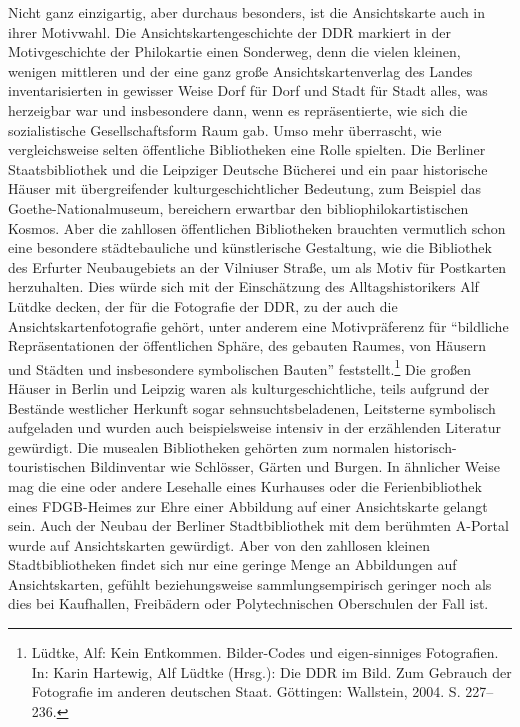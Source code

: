 \documentclass[a4paper,
fontsize=11pt,
oneside,
numbers=noperiodatend,
parskip=half-,
bibliography=totoc,
final
]{scrartcl}
\begin{document}
Nicht ganz einzigartig, aber durchaus besonders, ist die Ansichtskarte
auch in ihrer Motivwahl. Die Ansichtskartengeschichte der DDR markiert
in der Motivgeschichte der Philokartie einen Sonderweg, denn die vielen
kleinen, wenigen mittleren und der eine ganz große Ansichtskartenverlag
des Landes inventarisierten in gewisser Weise Dorf für Dorf und Stadt
für Stadt alles, was herzeigbar war und insbesondere dann, wenn es
repräsentierte, wie sich die sozialistische Gesellschaftsform Raum gab.
Umso mehr überrascht, wie vergleichsweise selten öffentliche
Bibliotheken eine Rolle spielten. Die Berliner Staatsbibliothek und die
Leipziger Deutsche Bücherei und ein paar historische Häuser mit
übergreifender kulturgeschichtlicher Bedeutung, zum Beispiel das
Goethe-Nationalmuseum, bereichern erwartbar den bibliophilokartistischen
Kosmos. Aber die zahllosen öffentlichen Bibliotheken brauchten
vermutlich schon eine besondere städtebauliche und künstlerische
Gestaltung, wie die Bibliothek des Erfurter Neubaugebiets an der
Vilniuser Straße, um als Motiv für Postkarten herzuhalten. Dies würde
sich mit der Einschätzung des Alltagshistorikers Alf Lütdke decken, der
für die Fotografie der DDR, zu der auch die Ansichtskartenfotografie
gehört, unter anderem eine Motivpräferenz für \enquote{bildliche
Repräsentationen der öffentlichen Sphäre, des gebauten Raumes, von
Häusern und Städten und insbesondere symbolischen Bauten}
feststellt.\footnote{Lüdtke, Alf: Kein Entkommen. Bilder-Codes und
  eigen-sinniges Fotografien. In: Karin Hartewig, Alf Lüdtke (Hrsg.):
  Die DDR im Bild. Zum Gebrauch der Fotografie im anderen deutschen
  Staat. Göttingen: Wallstein, 2004. S. 227--236.} Die großen Häuser in
Berlin und Leipzig waren als kulturgeschichtliche, teils aufgrund der
Bestände westlicher Herkunft sogar sehnsuchtsbeladenen, Leitsterne
symbolisch aufgeladen und wurden auch beispielsweise intensiv in der
erzählenden Literatur gewürdigt. Die musealen Bibliotheken gehörten zum
normalen historisch-touristischen Bildinventar wie Schlösser, Gärten und
Burgen. In ähnlicher Weise mag die eine oder andere Lesehalle eines
Kurhauses oder die Ferienbibliothek eines FDGB-Heimes zur Ehre einer
Abbildung auf einer Ansichtskarte gelangt sein. Auch der Neubau der
Berliner Stadtbibliothek mit dem berühmten A-Portal wurde auf
Ansichtskarten gewürdigt. Aber von den zahllosen kleinen
Stadtbibliotheken findet sich nur eine geringe Menge an Abbildungen auf
Ansichtskarten, gefühlt beziehungsweise sammlungsempirisch geringer noch
als dies bei Kaufhallen, Freibädern oder Polytechnischen Oberschulen der
Fall ist.
\end{document}
